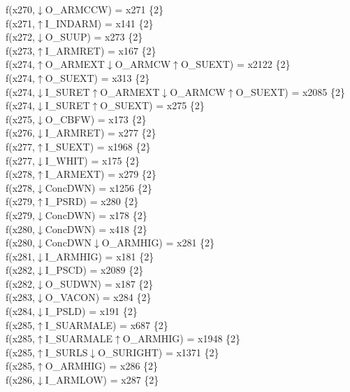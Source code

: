 f(x270,$\downarrow$O\_ARMCCW) = x271 \{2\} \\  
f(x271,$\uparrow$I\_INDARM) = x141 \{2\} \\  
f(x272,$\downarrow$O\_SUUP) = x273 \{2\} \\  
f(x273,$\uparrow$I\_ARMRET) = x167 \{2\} \\  
f(x274,$\uparrow$O\_ARMEXT$\downarrow$O\_ARMCW$\uparrow$O\_SUEXT) = x2122 \{2\} \\  
f(x274,$\uparrow$O\_SUEXT) = x313 \{2\} \\  
f(x274,$\downarrow$I\_SURET$\uparrow$O\_ARMEXT$\downarrow$O\_ARMCW$\uparrow$O\_SUEXT) = x2085 \{2\} \\  
f(x274,$\downarrow$I\_SURET$\uparrow$O\_SUEXT) = x275 \{2\} \\  
f(x275,$\downarrow$O\_CBFW) = x173 \{2\} \\  
f(x276,$\downarrow$I\_ARMRET) = x277 \{2\} \\  
f(x277,$\uparrow$I\_SUEXT) = x1968 \{2\} \\  
f(x277,$\downarrow$I\_WHIT) = x175 \{2\} \\  
f(x278,$\uparrow$I\_ARMEXT) = x279 \{2\} \\  
f(x278,$\downarrow$ConcDWN) = x1256 \{2\} \\  
f(x279,$\uparrow$I\_PSRD) = x280 \{2\} \\  
f(x279,$\downarrow$ConcDWN) = x178 \{2\} \\  
f(x280,$\downarrow$ConcDWN) = x418 \{2\} \\  
f(x280,$\downarrow$ConcDWN$\downarrow$O\_ARMHIG) = x281 \{2\} \\  
f(x281,$\downarrow$I\_ARMHIG) = x181 \{2\} \\  
f(x282,$\downarrow$I\_PSCD) = x2089 \{2\} \\  
f(x282,$\downarrow$O\_SUDWN) = x187 \{2\} \\  
f(x283,$\downarrow$O\_VACON) = x284 \{2\} \\  
f(x284,$\downarrow$I\_PSLD) = x191 \{2\} \\  
f(x285,$\uparrow$I\_SUARMALE) = x687 \{2\} \\  
f(x285,$\uparrow$I\_SUARMALE$\uparrow$O\_ARMHIG) = x1948 \{2\} \\  
f(x285,$\uparrow$I\_SURLS$\downarrow$O\_SURIGHT) = x1371 \{2\} \\  
f(x285,$\uparrow$O\_ARMHIG) = x286 \{2\} \\  
f(x286,$\downarrow$I\_ARMLOW) = x287 \{2\} \\  
